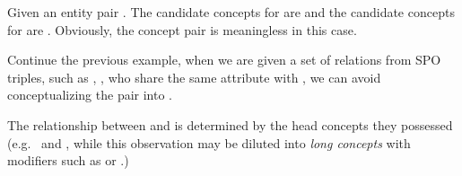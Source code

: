 {\footnotesize

\begin{example}
Given an entity pair . The candidate concepts for  are  and the candidate concepts for  are . Obviously, the concept pair  is meaningless in this case.
\label{exa:jc}
\end{example}


\begin{example}
Continue the previous example, when we are given a set of relations from SPO triples, such as , , who share the same attribute  with , we can 
avoid conceptualizing the pair into
.
\label{exa:sd}
\end{example}

\begin{example}
The  relationship between  and  is determined by the head concepts they possessed (e.g.\  and , while this observation may be diluted into \emph{long concepts} with  modifiers such as  or .)
\label{exa:hc}
\end{example}

}




